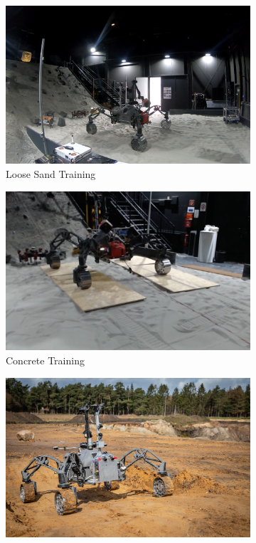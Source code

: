 \documentclass{article}
\begin{document}
\begin{figure}[!htb]
    \centering
    \begin{subfigure}[t]{0.32\textwidth}
        \includegraphics[width=\textwidth]{../figures/spacehall.png}
        \caption{Loose Sand Training}
    \end{subfigure}
    \begin{subfigure}[t]{0.32\textwidth}
        \includegraphics[width=\textwidth]{../figures/spacehallconcrete.png}
        \caption{Concrete Training}
    \end{subfigure}
    \begin{subfigure}[t]{0.32\textwidth}
        \includegraphics[width=\textwidth]{../figures/sandmine_v2.jpg}

\end{subfigure}
\end{figure}
\end{document}
